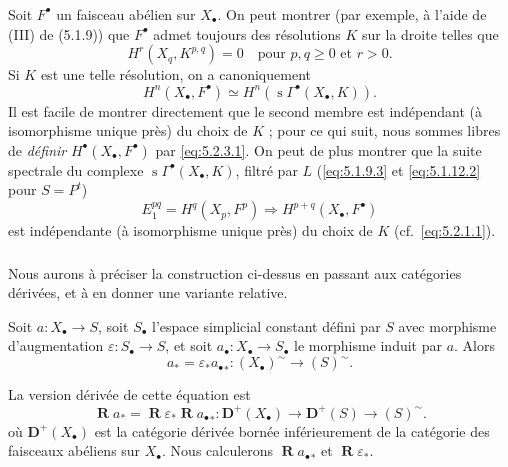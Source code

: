\documentclass[11pt]{amsart}
\theoremstyle{plain}
\theoremstyle{definition}
\DeclareMathOperator{\Rd}{\mathbf{R}}
\DeclareMathOperator{\simp}{s}
\newcommand{\DD}{\mathbf{D}}
\newcommand{\Pt}{P^t}
\begin{document}
\subsubsection{}
Soit $F^\bullet$ un faisceau ab\'elien sur $X_\bullet$. On peut montrer (par exemple, \`a l'aide de (III) de (5.1.9)) que $F^\bullet$ admet toujours des r\'esolutions $K$ sur la droite telles que
\[
H^r(X_q, K^{p,q}) = 0 \quad \text{pour } p,q \geq 0 \text{ et } r > 0.
\]
Si $K$ est une telle r\'esolution, on a canoniquement
\begin{equation}\label{eq:5.2.3.1}
H^n(X_\bullet, F^\bullet) \simeq H^n(\simp \Gamma^\bullet(X_\bullet, K)).
\end{equation}
Il est facile de montrer directement que le second membre est ind\'ependant (\`a isomorphisme unique pr\`es) du choix de $K$ ; pour ce qui suit, nous sommes libres de \emph{d\'efinir} $H^\bullet(X_\bullet, F^\bullet)$ par \eqref{eq:5.2.3.1}. On peut de plus montrer que la suite spectrale du complexe $\simp \Gamma^\bullet(X_\bullet, K)$, filtr\'e par $L$ (\eqref{eq:5.1.9.3} et \eqref{eq:5.1.12.2} pour $S = \Pt$)
\begin{equation}\label{eq:5.2.3.2}
E_1^{pq} = H^q(X_p, F^p) \Rightarrow H^{p+q}(X_\bullet, F^\bullet)
\end{equation}
est ind\'ependante (\`a isomorphisme unique pr\`es) du choix de $K$ (cf.\ \eqref{eq:5.2.1.1}).

\subsubsection{}
Nous aurons \`a pr\'eciser la construction ci-dessus en passant aux cat\'egories d\'eriv\'ees, et \`a en donner une variante relative.

Soit $a : X_\bullet \to S$, soit $S_\bullet$ l'espace simplicial constant d\'efini par $S$ avec morphisme d'augmentation $\varepsilon : S_\bullet \to S$, et soit $a_\bullet : X_\bullet \to S_\bullet$ le morphisme induit par $a$. Alors
\begin{equation}\label{eq:5.2.4.1}
a_* = \varepsilon_* {a_\bullet}_* : (X_\bullet)^\sim \to (S)^\sim.
\end{equation}

La version d\'eriv\'ee de cette \'equation est
\begin{equation}\label{eq:5.2.4.2}
\Rd a_* = \Rd \varepsilon_* \Rd {a_\bullet}_* : \DD^+(X_\bullet) \to \DD^+(S) \to (S)^\sim.
\end{equation}
o\`u $\DD^+(X_\bullet)$ est la cat\'egorie d\'eriv\'ee born\'ee inf\'erieurement de la cat\'egorie des faisceaux ab\'eliens sur $X_\bullet$. Nous calculerons $\Rd {a_\bullet}_*$ et $\Rd \varepsilon_*$.
\end{document}
